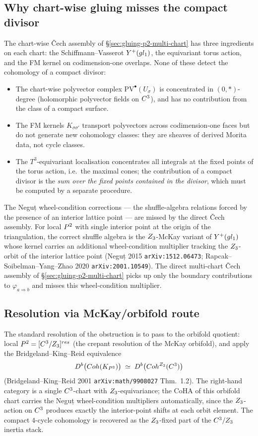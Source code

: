 \subsection{Why chart-wise gluing misses the compact divisor}

The chart-wise \v{C}ech assembly of \S\ref{sec:gluing-p2-multi-chart} has
three ingredients on each chart: the Schiffmann--Vasserot
$Y^+(gl_1)$, the equivariant torus action, and the FM kernel
on codimension-one overlaps.  None of these detect the cohomology of a
compact divisor:

\begin{itemize}
\item The chart-wise polyvector complex $\mathrm{PV}^\bullet(U_\sigma)$ is
  concentrated in $(0, *)$-degree (holomorphic polyvector fields on
  $C^3$), and has no contribution from the class of a compact surface.
\item The FM kernels $K_{\sigma \sigma'}$ transport polyvectors across
  codimension-one faces but do not generate new cohomology classes:
  they are sheaves of derived Morita data, not cycle classes.
\item The $T^3$-equivariant localisation concentrates all integrals at
  the fixed points of the torus action, i.e.\ the maximal cones; the
  contribution of a compact divisor is the \emph{sum over the fixed
  points contained in the divisor}, which must be computed by a separate
  procedure.
\end{itemize}
The Neguț wheel-condition corrections --- the shuffle-algebra
relations forced by the presence of an interior lattice point --- are
missed by the direct \v{C}ech assembly.  For local $P^2$ with single
interior point at the origin of the triangulation, the correct shuffle
algebra is the $Z_3$-McKay variant of $Y^+(gl_1)$ whose
kernel carries an additional wheel-condition multiplier tracking the
$Z_3$-orbit of the interior lattice point (Neguț 2015
\texttt{arXiv:1512.06473}; Rapcak--Soibelman--Yang--Zhao 2020
\texttt{arXiv:2001.10549}).  The direct multi-chart \v{C}ech assembly of
\S\ref{sec:gluing-p2-multi-chart} picks up only the boundary contributions
to $\varphi_{a \Rightarrow b}$ and misses this wheel-condition
multiplier.

\subsection{Resolution via McKay/orbifold route}

The standard resolution of the obstruction is to pass to the orbifold
quotient: local $P^2 = [C^3/Z_3]^{res}$ (the crepant
resolution of the McKay orbifold), and apply the Bridgeland--King--Reid
equivalence
\[
  D^b\bigl(Coh(K_{P^2})\bigr) \;\simeq\; D^b\bigl(Coh^{Z_3}(C^3)\bigr)
\]
(Bridgeland--King--Reid 2001 \texttt{arXiv:math/9908027} Thm.~1.2).  The
right-hand category is a single $C^3$-chart with $Z_3$-equivariance;
the CoHA of this orbifold chart carries the Neguț wheel-condition
multipliers automatically, since the $Z_3$-action on $C^3$ produces
exactly the interior-point shifts at each orbit element.  The compact
$4$-cycle cohomology is recovered as the $Z_3$-fixed part of the
$C^3/Z_3$ inertia stack.

